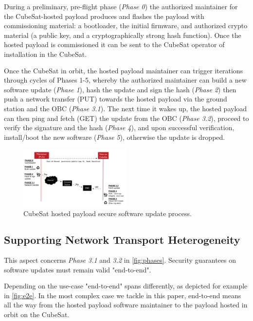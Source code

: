 During a preliminary, pre-flight phase (\textit{Phase 0}) the authorized maintainer for the CubeSat-hosted payload
produces and flashes the payload with commissioning material:
a bootloader, the initial firmware, and authorized crypto material (a public key, and a cryptographically strong hash function).
Once the hosted payload is commissioned it can be sent to the CubeSat operator of installation in the CubeSat.

Once the CubeSat in orbit, the hosted payload maintainer can trigger iterations through cycles of Phases 1-5, whereby
the authorized maintainer can build a new software update (\textit{Phase 1}), hash the update
and sign the hash (\textit{Phase 2}) then push a network transfer (PUT) towards the hosted payload via the ground station and the OBC (\textit{Phase 3.1}). The next time it wakes up, the hosted payload can
then ping and fetch (GET) the update from the OBC (\textit{Phase 3.2}), proceed to verify the signature and the hash (\textit{Phase 4}),
and upon successful verification, install/boot the new software (\textit{Phase 5}), otherwise the update is dropped.

\begin{figure}[t]
    \centering
    \includegraphics[width=0.5\textwidth]{Figures/CubeSat-Payload-update.png}
    \caption{CubeSat hosted payload secure software update process.}
    \label{fig:phases}
\end{figure}

\subsection{Supporting Network Transport Heterogeneity}
This aspect concerns \textit{Phase 3.1} and \textit{3.2} in \autoref{fig:phases}.  Security guarantees on software updates must remain valid "end-to-end".

Depending on the use-case "end-to-end" spans differently, as depicted for example in \autoref{fig:e2e}. In the most complex case we tackle in this paper, end-to-end means all the way from the hosted payload software maintainer to the payload hosted in orbit on the CubeSat.

